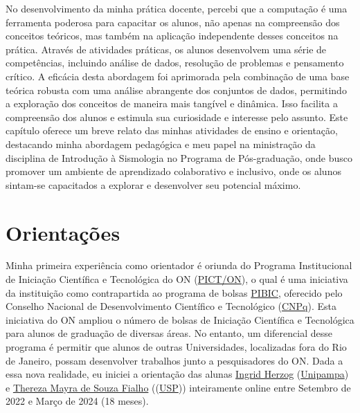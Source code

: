 \documentclass[10pt,a4paper,oneside]{book}
\begin{document}
No desenvolvimento da minha prática docente, percebi que a computação é uma ferramenta poderosa para capacitar os alunos, não apenas na compreensão dos conceitos teóricos, mas também na aplicação independente desses conceitos na prática. Através de atividades práticas, os alunos desenvolvem uma série de competências, incluindo análise de dados, resolução de problemas e pensamento crítico. A eficácia desta abordagem foi aprimorada pela combinação de uma base teórica robusta com uma análise abrangente dos conjuntos de dados, permitindo a exploração dos conceitos de maneira mais tangível e dinâmica. Isso facilita a compreensão dos alunos e estimula sua curiosidade e interesse pelo assunto. Este capítulo oferece um breve relato das minhas atividades de ensino e orientação, destacando minha abordagem pedagógica e meu papel na ministração da disciplina de Introdução à Sismologia no Programa de Pós-graduação, onde busco promover um ambiente de aprendizado colaborativo e inclusivo, onde os alunos sintam-se capacitados a explorar e desenvolver seu potencial máximo.

\section{Orientações}
\label{sec_orientacao}

Minha primeira experiência como orientador é oriunda do Programa Institucional de Iniciação Científica e Tecnológica do ON (\href{https://www.gov.br/observatorio/pt-br/assuntos/programas-academicos/iniciacao-cientifica-e-tecnologica/apresentacao}{PICT/ON}), o qual é uma iniciativa da instituição como contrapartida ao programa de bolsas \href{http://portal-adm.cnpq.br/web/guest/pibic/}{PIBIC}, oferecido pelo Conselho Nacional de Desenvolvimento Científico e Tecnológico (\href{https://www.gov.br/cnpq/pt-br}{CNPq}). Esta iniciativa do ON ampliou o número de bolsas de Iniciação Científica e Tecnológica para alunos de graduação de diversas áreas. No entanto, um diferencial desse programa é permitir que alunos de outras Universidades, localizadas fora do Rio de Janeiro, possam desenvolver trabalhos junto a pesquisadores do ON. Dada a essa nova realidade, eu iniciei a orientação das alunas \href{http://lattes.cnpq.br/4746789434324199}{Ingrid Herzog} (\href{https://unipampa.edu.br/portal/}{Unipampa}) e \href{http://lattes.cnpq.br/6698175242371919}{Thereza Mayra de Souza Fialho} ((\href{https://www5.usp.br/}{USP})) inteiramente online entre Setembro de 2022 e Março de 2024 (18 meses).
\end{document}
